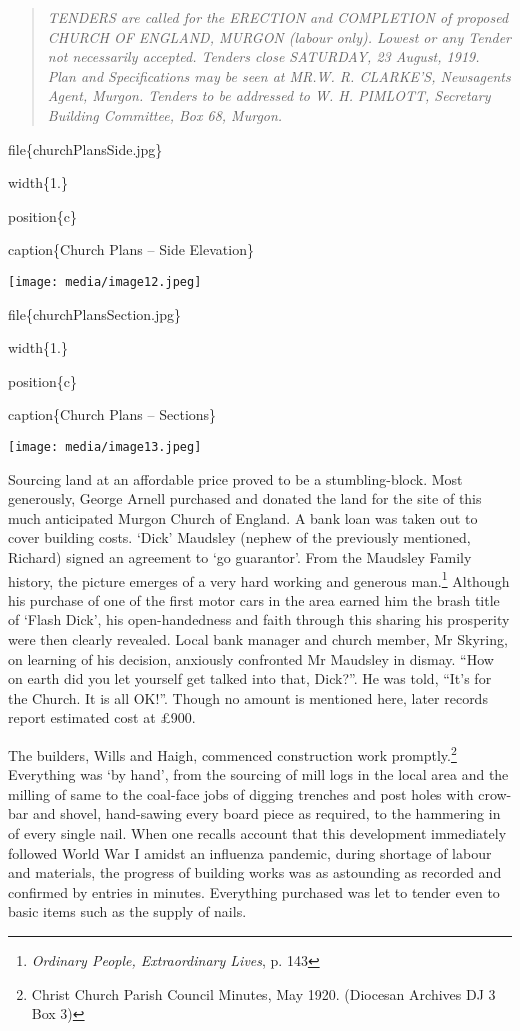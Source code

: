 \begin{quote}
\emph{TENDERS are called for the ERECTION and COMPLETION of proposed CHURCH OF ENGLAND, MURGON (labour only). Lowest or any Tender not necessarily accepted. Tenders close SATURDAY, 23 August, 1919. Plan and Specifications may be seen at MR.W. R. CLARKE'S, Newsagents Agent, Murgon. Tenders to be addressed to W. H. PIMLOTT, Secretary Building Committee, Box 68, Murgon.}
\end{quote}

file\{churchPlansSide.jpg\}

width\{1.\}

position\{c\}

caption\{Church Plans -- Side Elevation\}

\texttt{[image: media/image12.jpeg]}

file\{churchPlansSection.jpg\}

width\{1.\}

position\{c\}

caption\{Church Plans -- Sections\}

\texttt{[image: media/image13.jpeg]}

Sourcing land at an affordable price proved to be a stumbling-block. Most generously, George Arnell purchased and donated the land for the site of this much anticipated Murgon Church of England. A bank loan was taken out to cover building costs. `Dick' Maudsley (nephew of the previously mentioned, Richard) signed an agreement to `go guarantor'. From the Maudsley Family history, the picture emerges of a very hard working and generous man.\footnote{\emph{Ordinary People, Extraordinary Lives}, p. 143} Although his purchase of one of the first motor cars in the area earned him the brash title of `Flash Dick', his open-handedness and faith through this sharing his prosperity were then clearly revealed. Local bank manager and church member, Mr Skyring, on learning of his decision, anxiously confronted Mr Maudsley in dismay. ``How on earth did you let yourself get talked into that, Dick?''. He was told, ``It's for the Church. It is all OK!''. Though no amount is mentioned here, later records report estimated cost at £900.

The builders, Wills and Haigh, commenced construction work promptly.\footnote{Christ Church Parish Council Minutes, May 1920. (Diocesan Archives DJ 3 Box 3)} Everything was `by hand', from the sourcing of mill logs in the local area and the milling of same to the coal-face jobs of digging trenches and post holes with crow-bar and shovel, hand-sawing every board piece as required, to the hammering in of every single nail. When one recalls account that this development immediately followed World War I amidst an influenza pandemic, during shortage of labour and materials, the progress of building works was as astounding as recorded and confirmed by entries in minutes. Everything purchased was let to tender even to basic items such as the supply of nails.

